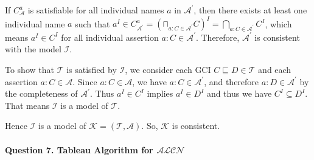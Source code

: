 \documentclass[12pt]{article}
\begin{document}
    If $C_{\mathcal{A}}^{a}$ is satisfiable for all individual names $a$ in $\mathcal{A}^{\prime}$, then there exists at least one individual name $a$ such that $a^I\in C_{\mathcal{A}^{\prime}}^a=\left(\mathbf{\sqcap}_{a:C\in \mathcal{A}^{\prime}}C\right)^I=\bigcap_{a:C\in \mathcal{A}^{\prime}}C^I$, which means $a^I \in C^I$ for all individual assertion $a:C\in \mathcal{A}^{\prime}$. Therefore, $\mathcal{A}^{\prime}$ is consistent with the model $\mathcal{I}$. \par
    To show that $\mathcal{T}$ is satisfied by $\mathcal{I}$, we consider each GCI $C\sqsubseteq D\in \mathcal{T}$ and each assertion $a:C\in \mathcal{A}$. Since $a:C\in \mathcal{A}$, we have $a:C\in \mathcal{A}^{\prime}$, and therefore $a:D\in \mathcal{A}^{\prime}$ by the completeness of $\mathcal{A}^{\prime}$. Thus  $a^I \in C^I$ implies $a^I \in D^I$ and thus we have $C^I \subseteq D^I$. That means $\mathcal{I}$ is a model of $\mathcal{T}$. \par
    Hence $\mathcal{I}$ is a model of $\mathcal{K}=(\mathcal{T}, \mathcal{A})$. So, $\mathcal{K}$ is consistent.

        \paragraph{Question 7. Tableau Algorithm for $\mathcal{ALCN}$}~{}
    \\
\end{document}
